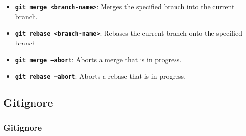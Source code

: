 \documentclass{beamer}
\begin{document}
    \begin{frame}
       \begin{itemize}
           \item {\textbf{\texttt{git merge <branch-name>}}}: Merges the specified branch into the current branch.
           \item {\textbf{\texttt{git rebase <branch-name>}}}: Rebases the current branch onto the specified branch.
           \item {\textbf{\texttt{git merge --abort}}}: Aborts a merge that is in progress.
           \item {\textbf{\texttt{git rebase --abort}}}: Aborts a rebase that is in progress.
       \end{itemize}
   \end{frame}

    \subsection{Gitignore}\label{subsec:gitignore}
    \begin{frame}
        \frametitle{Gitignore}
        \begin{figure}[H]
            \centering
            \noindent
        \end{figure}
    \end{frame}
\end{document}
